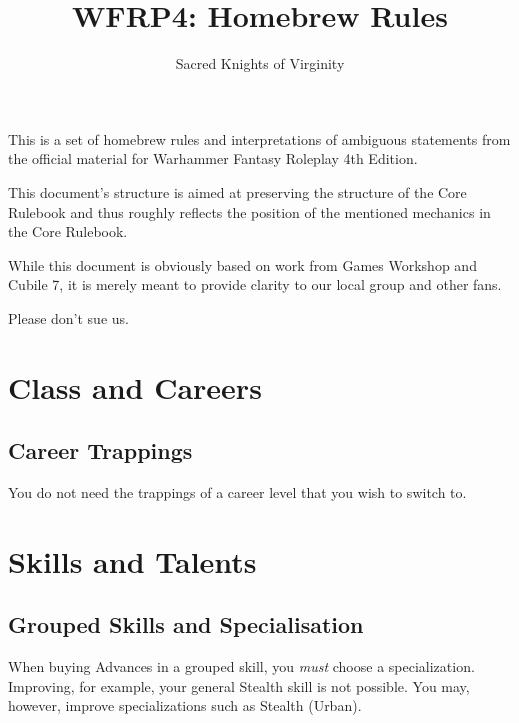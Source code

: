 \documentclass[parskip=full,11pt]{wfrp-short}
\title{WFRP4: Homebrew Rules}
\author{Sacred Knights of Virginity}
\begin{document}
\maketitle
\thispagestyle{empty} %

\section*{} %
\vspace{5pt}
This is a set of homebrew rules and interpretations of ambiguous statements
from the official material for Warhammer Fantasy Roleplay 4th Edition.

This document's structure is aimed at preserving the structure of the Core
Rulebook and thus roughly reflects the position of the mentioned mechanics in
the Core Rulebook.

While this document is obviously based on work from Games Workshop and Cubile
7, it is merely meant to provide clarity to our local group and other fans.

Please don't sue us.

\pagebreak
\tableofcontents

\pagebreak

\section{Class and Careers}

\subsection{Career Trappings}
You do not need the trappings of a career level that you wish to switch to.

\section{Skills and Talents}

\subsection{Grouped Skills and Specialisation}
When buying Advances in a grouped skill, you \textit{must} choose a
specialization.
Improving, for example, your general Stealth skill is not possible.
You may, however, improve specializations such as Stealth (Urban).
\end{document}
